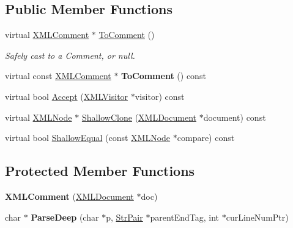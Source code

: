 \subsection*{Public Member Functions}
\begin{DoxyCompactItemize}
\item 
\mbox{\label{classtinyxml2_1_1_x_m_l_comment_a8093e1dc8a34fa446d9dc3fde0e6c0ee}} 
virtual \hyperlink{classtinyxml2_1_1_x_m_l_comment}{X\+M\+L\+Comment} $\ast$ \hyperlink{classtinyxml2_1_1_x_m_l_comment_a8093e1dc8a34fa446d9dc3fde0e6c0ee}{To\+Comment} ()
\begin{DoxyCompactList}\small\item\em Safely cast to a Comment, or null. \end{DoxyCompactList}\item 
\mbox{\label{classtinyxml2_1_1_x_m_l_comment_a8e60caf06d8e88876a94b81db026b85c}} 
virtual const \hyperlink{classtinyxml2_1_1_x_m_l_comment}{X\+M\+L\+Comment} $\ast$ {\bfseries To\+Comment} () const
\item 
virtual bool \hyperlink{classtinyxml2_1_1_x_m_l_comment_a27b37d16cea01b5329dfbbb4f9508e39}{Accept} (\hyperlink{classtinyxml2_1_1_x_m_l_visitor}{X\+M\+L\+Visitor} $\ast$visitor) const
\item 
virtual \hyperlink{classtinyxml2_1_1_x_m_l_node}{X\+M\+L\+Node} $\ast$ \hyperlink{classtinyxml2_1_1_x_m_l_comment_adf5b5c0319351dcc339df098d11e8fb2}{Shallow\+Clone} (\hyperlink{classtinyxml2_1_1_x_m_l_document}{X\+M\+L\+Document} $\ast$document) const
\item 
virtual bool \hyperlink{classtinyxml2_1_1_x_m_l_comment_a965d880a99d58dd915caa88dc37a9b51}{Shallow\+Equal} (const \hyperlink{classtinyxml2_1_1_x_m_l_node}{X\+M\+L\+Node} $\ast$compare) const
\end{DoxyCompactItemize}
\subsection*{Protected Member Functions}
\begin{DoxyCompactItemize}
\item 
\mbox{\label{classtinyxml2_1_1_x_m_l_comment_ae6463adc3edd93a8e5a9b2b7e99cdf91}} 
{\bfseries X\+M\+L\+Comment} (\hyperlink{classtinyxml2_1_1_x_m_l_document}{X\+M\+L\+Document} $\ast$doc)
\item 
\mbox{\label{classtinyxml2_1_1_x_m_l_comment_a3430281eed8d1023bafa9e633f44f509}} 
char $\ast$ {\bfseries Parse\+Deep} (char $\ast$p, \hyperlink{classtinyxml2_1_1_str_pair}{Str\+Pair} $\ast$parent\+End\+Tag, int $\ast$cur\+Line\+Num\+Ptr)
\end{DoxyCompactItemize}
